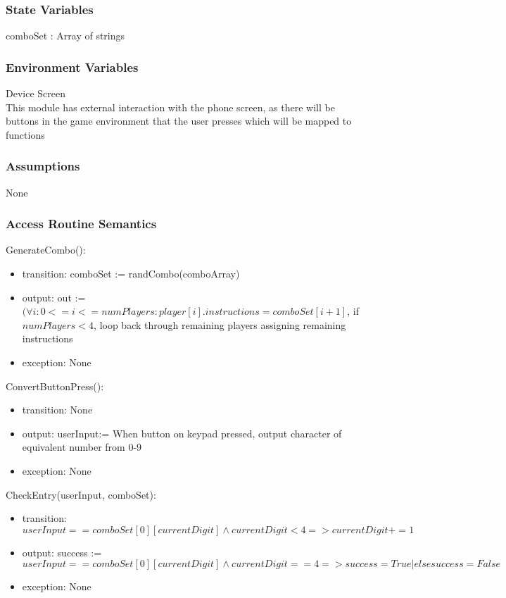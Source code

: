 \documentclass[12pt, titlepage]{article}
\begin{document}
\subsubsection{State Variables}

comboSet : Array of strings

\subsubsection{Environment Variables}

Device Screen\\
This module has external interaction with the phone screen, as there will be buttons in the game environment that the user presses which will be mapped to functions


\subsubsection{Assumptions}

None

\subsubsection{Access Routine Semantics}

\noindent GenerateCombo():
\begin{itemize}
\item transition: comboSet := randCombo(comboArray)
\item output: out := $ (\forall i : 0<=i<=numPlayers : player[i].instructions = comboSet[i+1]$, if $numPlayers<4$, loop back through remaining players assigning remaining instructions
\item exception: None
\end{itemize}

\noindent ConvertButtonPress():
\begin{itemize}
\item transition: None
\item output: userInput:= When button on keypad pressed, output character of equivalent number from 0-9
\item exception: None
\end{itemize}

\noindent CheckEntry(userInput, comboSet):
\begin{itemize}
\item transition: $userInput == comboSet[0][currentDigit] \land currentDigit<4 => currentDigit+=1$
\item output: success := $userInput == comboSet[0][currentDigit] \land currentDigit==4 => success=True | else success = False$
\item exception: None
\end{itemize}
\end{document}
